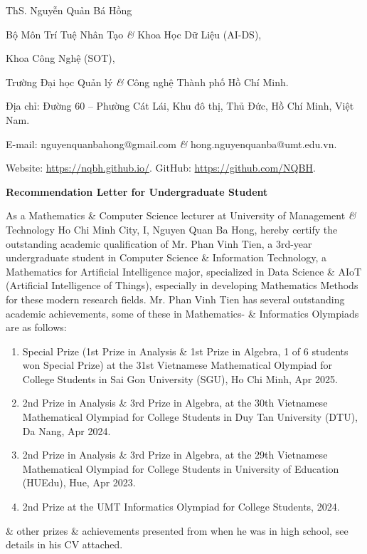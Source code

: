 \documentclass[11pt]{article}
\begin{document}
\begin{flushright}
    ThS. {\sc Nguyễn Quản Bá Hồng}
    
    Bộ Môn Trí Tuệ Nhân Tạo {\it\&} Khoa Học Dữ Liệu (AI-DS),
    
    Khoa Công Nghệ (SOT),
    
    Trường Đại học Quản lý {\it\&} Công nghệ Thành phố Hồ Chí Minh.
    
    Địa chỉ: Đường 60 -- Phường Cát Lái, Khu đô thị, Thủ Đức, Hồ Chí Minh, Việt Nam.
    
    E-mail: {\sf nguyenquanbahong@gmail.com} {\it\&} {\sf hong.nguyenquanba@umt.edu.vn}.
    
    Website: \url{https://nqbh.github.io/}. GitHub: \url{https://github.com/NQBH}.
\end{flushright}
\vspace{5mm}
\begin{center}
    \LARGE
    \textbf{\textsf{Recommendation Letter for Undergraduate Student}}
\end{center}
As a Mathematics \& Computer Science lecturer at University of Management {\it\&} Technology Ho Chi Minh City, I, {\sc Nguyen Quan Ba Hong}, hereby certify the outstanding academic qualification of Mr. {\sc Phan Vinh Tien}, a 3rd-year undergraduate student in Computer Science \& Information Technology, a Mathematics for Artificial Intelligence major, specialized in Data Science \& AIoT (Artificial Intelligence of Things), especially in developing Mathematics Methods for these modern research fields. Mr. {\sc Phan Vinh Tien} has several outstanding academic achievements, some of these in Mathematics- \& Informatics Olympiads are as follows:
\begin{enumerate}
    \item Special Prize (1st Prize in Analysis \& 1st Prize in Algebra, 1 of 6 students won Special Prize) at the 31st Vietnamese Mathematical Olympiad for College Students in Sai Gon University (SGU), Ho Chi Minh, Apr 2025.
    
    \item 2nd Prize in Analysis \& 3rd Prize in Algebra, at the 30th Vietnamese Mathematical Olympiad for College Students in Duy Tan University (DTU), Da Nang, Apr 2024.
    
    \item 2nd Prize in Analysis \& 3rd Prize in Algebra, at the 29th Vietnamese Mathematical Olympiad for College Students in University of Education (HUEdu), Hue, Apr 2023.
    
    \item 2nd Prize at the UMT Informatics Olympiad for College Students, 2024.
\end{enumerate}
\& other prizes \& achievements presented from when he was in high school, see details in his CV attached.
\end{document}
